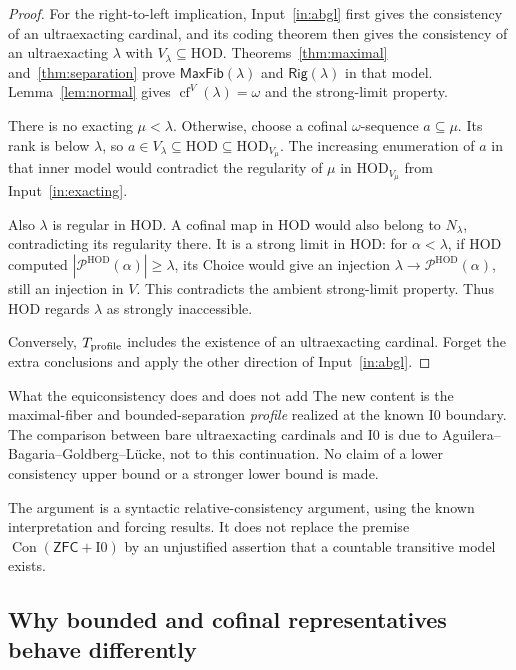 \documentclass[11pt,letterpaper]{article}
\theoremstyle{definition}
\numberwithin{equation}{section}
\newcommand{\ZFC}{\mathsf{ZFC}}
\newcommand{\HOD}{\mathrm{HOD}}
\newcommand{\Con}{\operatorname{Con}}
\newcommand{\cf}{\operatorname{cf}}
\newcommand{\Pow}{\mathcal P}
\newcommand{\Izero}{\mathrm{I0}}
\newcommand{\MaxFib}{\mathsf{MaxFib}}
\newcommand{\Rig}{\mathsf{Rig}}
\newcommand{\Nlam}{N_\lambda}
\begin{document}
\begin{proof}
For the right-to-left implication, Input~\ref{in:abgl} first gives the consistency of an ultraexacting cardinal, and its coding theorem then gives the consistency of an ultraexacting $\lambda$ with $V_\lambda\subseteq\HOD$. Theorems~\ref{thm:maximal} and~\ref{thm:separation} prove $\MaxFib(\lambda)$ and $\Rig(\lambda)$ in that model. Lemma~\ref{lem:normal} gives $\cf^V(\lambda)=\omega$ and the strong-limit property.

There is no exacting $\mu<\lambda$. Otherwise, choose a cofinal $\omega$-sequence $a\subseteq\mu$. Its rank is below $\lambda$, so $a\in V_\lambda\subseteq\HOD\subseteq\HOD_{V_\mu}$. The increasing enumeration of $a$ in that inner model would contradict the regularity of $\mu$ in $\HOD_{V_\mu}$ from Input~\ref{in:exacting}.

Also $\lambda$ is regular in $\HOD$. A cofinal map in $\HOD$ would also belong to $\Nlam$, contradicting its regularity there. It is a strong limit in $\HOD$: for $\alpha<\lambda$, if $\HOD$ computed $|\Pow^{\HOD}(\alpha)|\ge\lambda$, its Choice would give an injection $\lambda\to\Pow^{\HOD}(\alpha)$, still an injection in $V$. This contradicts the ambient strong-limit property. Thus $\HOD$ regards $\lambda$ as strongly inaccessible.

Conversely, $T_{\rm profile}$ includes the existence of an ultraexacting cardinal. Forget the extra conclusions and apply the other direction of Input~\ref{in:abgl}.
\end{proof}

\begin{assessment}{What the equiconsistency does and does not add}
The new content is the maximal-fiber and bounded-separation \emph{profile} realized at the known $\Izero$ boundary. The comparison between bare ultraexacting cardinals and $\Izero$ is due to Aguilera--Bagaria--Goldberg--L\"ucke, not to this continuation. No claim of a lower consistency upper bound or a stronger lower bound is made.
\end{assessment}

The argument is a syntactic relative-consistency argument, using the known interpretation and forcing results. It does not replace the premise $\Con(\ZFC+\Izero)$ by an unjustified assertion that a countable transitive model exists.

\subsection{Why bounded and cofinal representatives behave differently}
\end{document}
